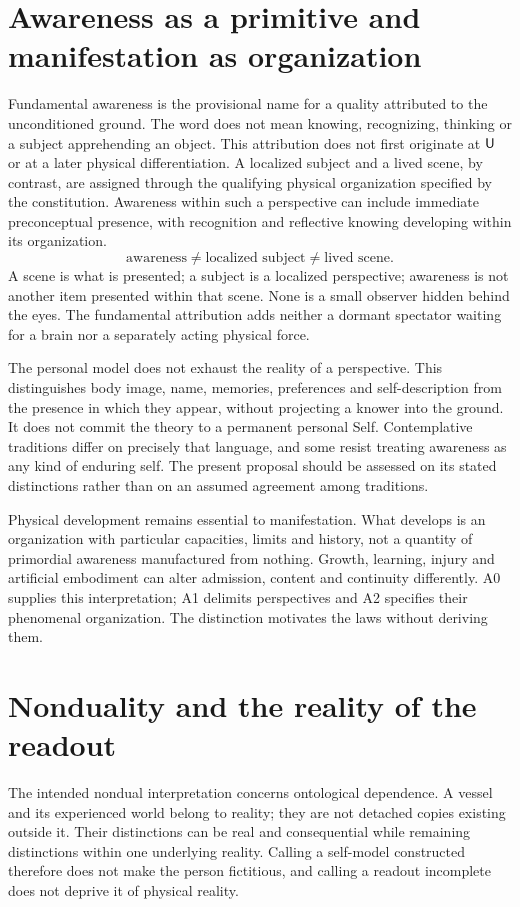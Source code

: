 \section{Awareness as a primitive and manifestation as organization}\label{sec:primitive-motivation}
Fundamental awareness is the provisional name for a quality attributed to the unconditioned ground. The word does not mean knowing, recognizing, thinking or a subject apprehending an object. This attribution does not first originate at $\mathsf{U}$ or at a later physical differentiation. A localized subject and a lived scene, by contrast, are assigned through the qualifying physical organization specified by the constitution. Awareness within such a perspective can include immediate preconceptual presence, with recognition and reflective knowing developing within its organization.
\[
\boxed{\text{awareness}\neq\text{localized subject}\neq\text{lived scene}.}
\]
A scene is what is presented; a subject is a localized perspective; awareness is not another item presented within that scene. None is a small observer hidden behind the eyes. The fundamental attribution adds neither a dormant spectator waiting for a brain nor a separately acting physical force.

The personal model does not exhaust the reality of a perspective. This distinguishes body image, name, memories, preferences and self-description from the presence in which they appear, without projecting a knower into the ground. It does not commit the theory to a permanent personal Self. Contemplative traditions differ on precisely that language, and some resist treating awareness as any kind of enduring self. The present proposal should be assessed on its stated distinctions rather than on an assumed agreement among traditions.

Physical development remains essential to manifestation. What develops is an organization with particular capacities, limits and history, not a quantity of primordial awareness manufactured from nothing. Growth, learning, injury and artificial embodiment can alter admission, content and continuity differently. A0 supplies this interpretation; A1 delimits perspectives and A2 specifies their phenomenal organization. The distinction motivates the laws without deriving them.

\section{Nonduality and the reality of the readout}\label{sec:nondual}
The intended nondual interpretation concerns ontological dependence. A vessel and its experienced world belong to reality; they are not detached copies existing outside it. Their distinctions can be real and consequential while remaining distinctions within one underlying reality. Calling a self-model constructed therefore does not make the person fictitious, and calling a readout incomplete does not deprive it of physical reality.

